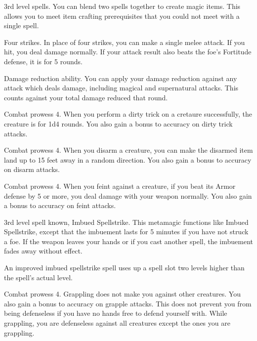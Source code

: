 \featpre 3rd level spells.
\featben You can blend two spells together to create magic items.
This allows you to meet item crafting prerequisites that you could not meet with a single spell.

\featpre Four strikes.
\featben In place of four strikes, you can make a single melee attack.
If you hit, you deal damage normally.
If your attack result also beats the foe's Fortitude defense, it is \immobilized for 5 rounds.

\featpre Damage reduction ability.
\featben You can apply your damage reduction against any attack which deals damage, including magical and supernatural attacks.
This counts against your total damage reduced that round.

\featpre Combat prowess 4.
\featben When you perform a dirty trick on a cretaure successfully, the creature is \impaired for 1d4 rounds.
You also gain a  bonus to accuracy on dirty trick attacks.

\featpre Combat prowess 4.
\featben When you disarm a creature, you can make the disarmed item land up to 15 feet away in a random direction.
You also gain a  bonus to accuracy on disarm attacks.

\featpre Combat prowess 4.
\featben When you feint against a creature, if you beat its Armor defense by 5 or more, you deal damage with your weapon normally.
You also gain a  bonus to accuracy on feint attacks.

\featpres 3rd level spell known, Imbued Spellstrike.
\featben This metamagic functions like Imbued Spellstrike, except that the imbuement lasts for 5 minutes if you have not struck a foe.
If the weapon leaves your hands or if you cast another spell, the imbuement fades away without effect.

An improved imbued spellstrike spell uses up a spell slot two levels higher than the spell's actual level.

\featpre Combat prowess 4.
\featben Grappling does not make you  against other creatures.
You also gain a  bonus to accuracy on grapple attacks.
This does not prevent you from being defenseless if you have no hands free to defend yourself with.
While grappling, you are defenseless against all creatures except the ones you are grappling.

